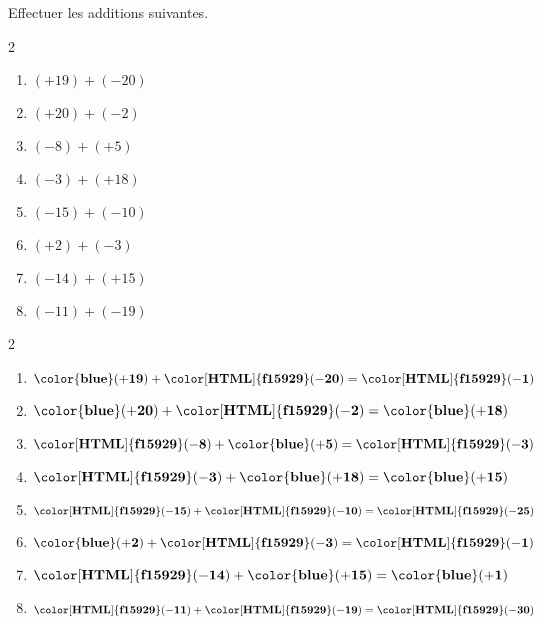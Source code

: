 \begin{exercice*}
    Effectuer les additions suivantes.
    \begin{multicols}2
        \begin{enumerate}            
                \item $ (+19) + (-20)$
                \item $ (+20) + (-2)$
                \item $ (-8) + (+5)$
                \item $ (-3) + (+18)$
                \item $ (-15) + (-10)$
                \item $ (+2) + (-3)$
                \item $ (-14) + (+15)$
                \item $ (-11) + (-19)$            
        \end{enumerate}
    \end{multicols}
\end{exercice*}
\begin{corrige}
    \phantom{rrr}
    \begin{multicols}2
        \begin{enumerate}
            \item $ \mathbf{{\color{blue}(+19)}} + \mathbf{{\color[HTML]{f15929}(-20)}} = \mathbf{{\color[HTML]{f15929}(-1)}} $
            \item $ \mathbf{{\color{blue}(+20)}} + \mathbf{{\color[HTML]{f15929}(-2)}} = \mathbf{{\color{blue}(+18)}} $
            \item $ \mathbf{{\color[HTML]{f15929}(-8)}} + \mathbf{{\color{blue}(+5)}} = \mathbf{{\color[HTML]{f15929}(-3)}} $
            \item $ \mathbf{{\color[HTML]{f15929}(-3)}} + \mathbf{{\color{blue}(+18)}} = \mathbf{{\color{blue}(+15)}} $
            \item $ \mathbf{{\color[HTML]{f15929}(-15)}} + \mathbf{{\color[HTML]{f15929}(-10)}} = \mathbf{{\color[HTML]{f15929}(-25)}} $
            \item $ \mathbf{{\color{blue}(+2)}} + \mathbf{{\color[HTML]{f15929}(-3)}} = \mathbf{{\color[HTML]{f15929}(-1)}} $
            \item $ \mathbf{{\color[HTML]{f15929}(-14)}} + \mathbf{{\color{blue}(+15)}} = \mathbf{{\color{blue}(+1)}} $
            \item $ \mathbf{{\color[HTML]{f15929}(-11)}} + \mathbf{{\color[HTML]{f15929}(-19)}} = \mathbf{{\color[HTML]{f15929}(-30)}} $
        \end{enumerate}   
    \end{multicols}
\end{corrige}